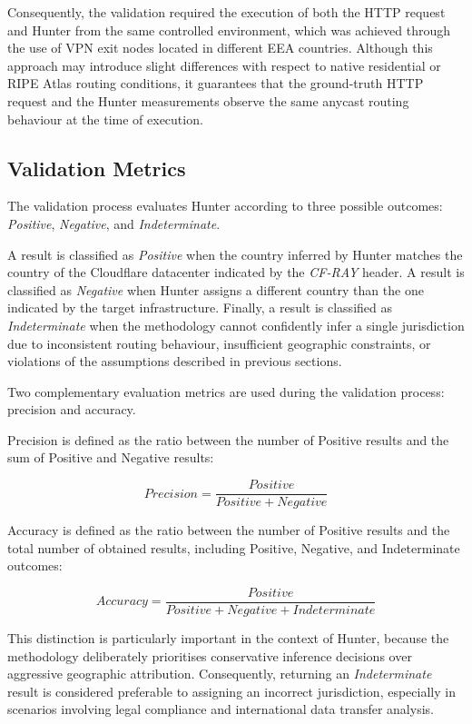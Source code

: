 Consequently, the validation required the execution of both the HTTP request and Hunter from the same controlled environment, which was achieved through the use of VPN exit nodes located in different EEA countries. Although this approach may introduce slight differences with respect to native residential or RIPE Atlas routing conditions, it guarantees that the ground-truth HTTP request and the Hunter measurements observe the same anycast routing behaviour at the time of execution.

\subsection{Validation Metrics}

The validation process evaluates Hunter according to three possible outcomes: \textit{Positive}, \textit{Negative}, and \textit{Indeterminate}.

A result is classified as \textit{Positive} when the country inferred by Hunter matches the country of the Cloudflare datacenter indicated by the \textit{CF-RAY} header. A result is classified as \textit{Negative} when Hunter assigns a different country than the one indicated by the target infrastructure. Finally, a result is classified as \textit{Indeterminate} when the methodology cannot confidently infer a single jurisdiction due to inconsistent routing behaviour, insufficient geographic constraints, or violations of the assumptions described in previous sections.

Two complementary evaluation metrics are used during the validation process: precision and accuracy.

Precision is defined as the ratio between the number of Positive results and the sum of Positive and Negative results:

\begin{equation*}
    Precision = \frac{Positive}{Positive + Negative}
\end{equation*}

Accuracy is defined as the ratio between the number of Positive results and the total number of obtained results, including Positive, Negative, and Indeterminate outcomes:

\begin{equation*}
    Accuracy = \frac{Positive}{Positive + Negative + Indeterminate}
\end{equation*}

This distinction is particularly important in the context of Hunter, because the methodology deliberately prioritises conservative inference decisions over aggressive geographic attribution. Consequently, returning an \textit{Indeterminate} result is considered preferable to assigning an incorrect jurisdiction, especially in scenarios involving legal compliance and international data transfer analysis.

